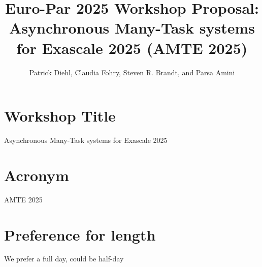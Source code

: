 \documentclass{article}
\title{Euro-Par 2025 Workshop Proposal: Asynchronous Many-Task systems for Exascale 2025 (AMTE 2025)
}
\author{Patrick Diehl, Claudia Fohry, Steven R. Brandt, and Parsa Amini }
\begin{document}
\maketitle

\section*{Workshop Title}
Asynchronous Many-Task systems for Exascale 2025
\section*{Acronym}
AMTE 2025

\section*{Preference for length}
We prefer a full day, could be half-day
\end{document}
